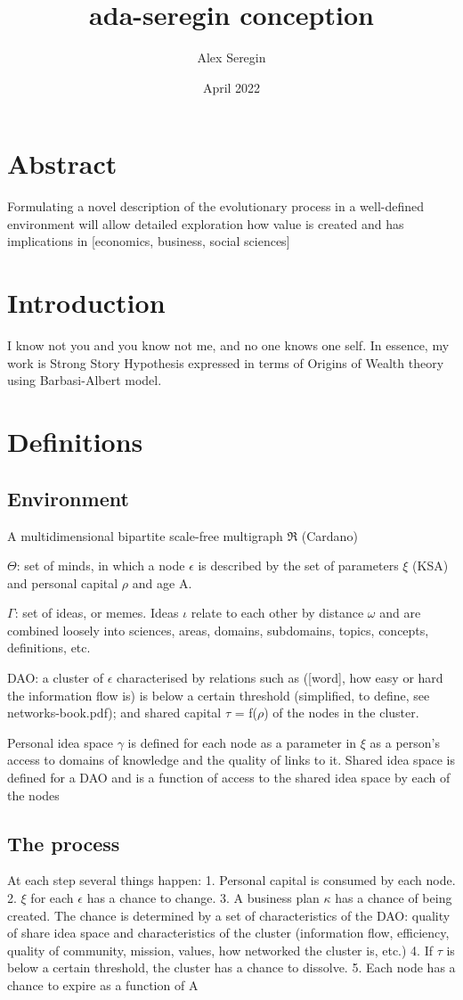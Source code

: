 \documentclass{article}
\title{ada-seregin conception}
\author{Alex Seregin}
\date{April 2022}
\begin{document}
\maketitle
\section{Abstract}
Formulating a novel description of the evolutionary process in a well-defined environment will allow detailed exploration how value is created and has implications in [economics, business, social sciences]
\section{Introduction}
I know not you and you know not me, and no one knows one self.
In essence, my work is Strong Story Hypothesis expressed in terms of Origins of Wealth theory using Barbasi-Albert model.

\section{Definitions}
\subsection{Environment}
A multidimensional bipartite scale-free multigraph $\Re$ (Cardano)

$\Theta$: set of minds, in which a node $\epsilon$ is described by the set of parameters $\xi$ (KSA) and personal capital $\rho$ and age A.

$\Gamma$: set of ideas, or memes. Ideas $\iota$ relate to each other by distance $\omega$ and are combined loosely into sciences, areas, domains, subdomains, topics, concepts, definitions, etc.

DAO: a cluster of $\epsilon$ characterised by relations such as ([word], how easy or hard the information flow is) is below a certain threshold (simplified, to define, see networks-book.pdf); and shared capital $\tau$ = f($\rho$) of the nodes in the cluster.

Personal idea space $\gamma$ is defined for each node as a parameter in $\xi$ as a person's access to domains of knowledge and the quality of links to it. 
Shared idea space is defined for a DAO and is a function of access to the shared idea space by each of the nodes

\subsection{The process}
At each step several things happen:
1. Personal capital is consumed by each node. 
2. $\xi$ for each $\epsilon$ has a chance to change.
3. A business plan $\kappa$ has a chance of being created. The chance is determined by a set of characteristics of the DAO: quality of share idea space and characteristics of the cluster (information flow, efficiency, quality of community, mission, values, how networked the cluster is, etc.)
4. If $\tau$ is below a certain threshold, the cluster has a chance to dissolve.
5. Each node has a chance to expire as a function of A
\end{document}
